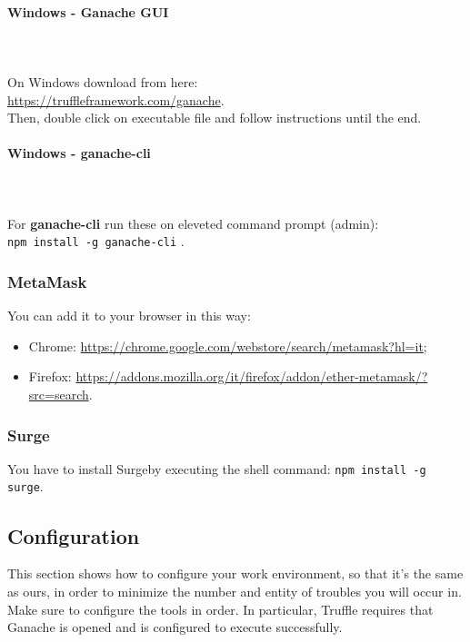 \paragraph{Windows - Ganache GUI} \mbox{} \\ \mbox{} \\
On Windows download from here: \\
\url{https://truffleframework.com/ganache}. \\
Then, double click on executable file and follow instructions until the end.
\paragraph{Windows - ganache-cli} \mbox{} \\ \mbox{} \\ 
For \textbf{ganache-cli} run these on eleveted command prompt (admin):\\
\texttt{npm install -g ganache-cli} .
\subsubsection{MetaMask}
You can add it to your browser in this way:
\begin{itemize}
	\item Chrome:  \href{https://chrome.google.com/webstore/search/metamask?hl=it}{https://chrome.google.com/webstore/search/metamask?hl=it};
	\item Firefox: \href{https://addons.mozilla.org/it/firefox/addon/ether-metamask/?src=search}{https://addons.mozilla.org/it/firefox/addon/ether-metamask/?src=search}.
\end{itemize}


\subsubsection{Surge}
You have to install Surge\glosp by executing the shell command: \texttt{npm install -g surge}.


\subsection{Configuration}
This section shows how to configure your work environment, so that it's the same as ours, in order to minimize the number and entity of troubles you will occur in.\\
Make sure to configure the tools in order. In particular, Truffle requires that Ganache is opened and is configured to execute successfully.
